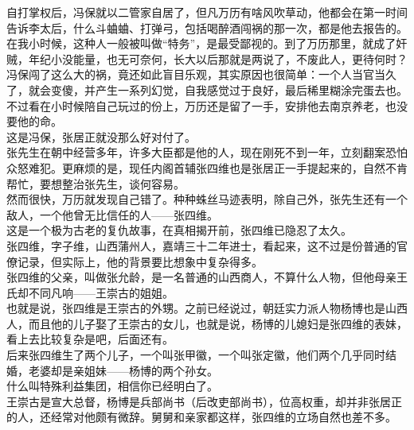 \begin{multicols}{\theparacolNo}
自打掌权后，冯保就以二管家自居了，但凡万历有啥风吹草动，他都会在第一时间告诉李太后，什么斗蛐蛐、打弹弓，包括喝醉酒闯祸的那一次，都是他去报告的。\\

在我小时候，这种人一般被叫做“特务”，是最受鄙视的。到了万历那里，就成了奸贼，年纪小没能量，也无可奈何，长大以后那就是两说了，不废此人，更待何时？\\

冯保闯了这么大的祸，竟还如此盲目乐观，其实原因也很简单：一个人当官当久了，就会变傻，并产生一系列幻觉，自我感觉过于良好，最后稀里糊涂完蛋去也。\\

不过看在小时候陪自己玩过的份上，万历还是留了一手，安排他去南京养老，也没要他的命。\\

这是冯保，张居正就没那么好对付了。\\

张先生在朝中经营多年，许多大臣都是他的人，现在刚死不到一年，立刻翻案恐怕众怒难犯。更麻烦的是，现任内阁首辅张四维也是张居正一手提起来的，自然不肯帮忙，要想整治张先生，谈何容易。\\

然而很快，万历就发现自己错了。种种蛛丝马迹表明，除自己外，张先生还有一个敌人，一个他曾无比信任的人——张四维。\\

这是一个极为古老的复仇故事，在真相揭开前，张四维已隐忍了太久。\\

张四维，字子维，山西蒲州人，嘉靖三十二年进士，看起来，这不过是份普通的官僚记录，但实际上，他的背景要比想象中复杂得多。\\

张四维的父亲，叫做张允龄，是一名普通的山西商人，不算什么人物，但他母亲王氏却不同凡响——王崇古的姐姐。\\

也就是说，张四维是王崇古的外甥。之前已经说过，朝廷实力派人物杨博也是山西人，而且他的儿子娶了王崇古的女儿，也就是说，杨博的儿媳妇是张四维的表妹，看上去比较复杂是吧，后面还有。\\

后来张四维生了两个儿子，一个叫张甲徽，一个叫张定徽，他们两个几乎同时结婚，老婆却是亲姐妹——杨博的两个孙女。\\

什么叫特殊利益集团，相信你已经明白了。\\

王崇古是宣大总督，杨博是兵部尚书（后改吏部尚书），位高权重，却并非张居正的人，还经常对他颇有微辞。舅舅和亲家都这样，张四维的立场自然也差不多。\\


\end{multicols}
